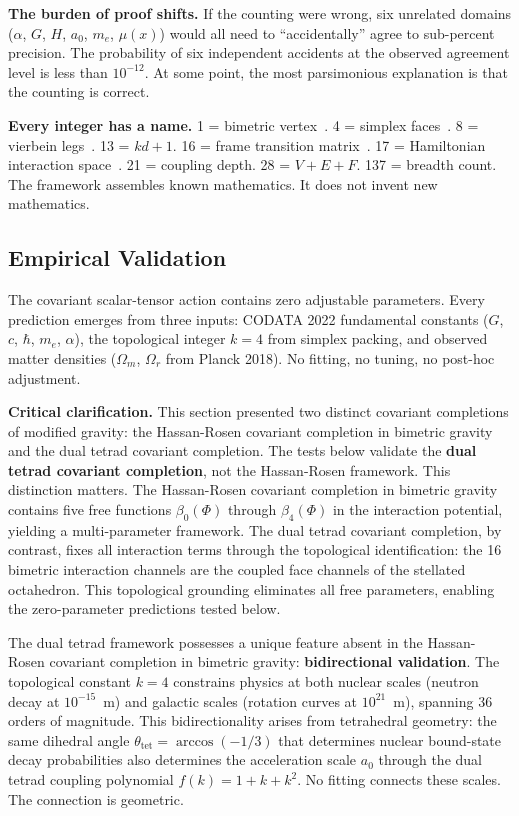 \documentclass[aps,prd,preprint,superscriptaddress,showpacs,preprintnumbers,amsmath,amssymb,nofootinbib]{revtex4-2}
\begin{document}
\textbf{The burden of proof shifts.} If the counting were wrong, six unrelated domains ($\alpha$, $G$, $H$, $a_0$, $m_e$, $\mu(x)$) would all need to ``accidentally'' agree to sub-percent precision. The probability of six independent accidents at the observed agreement level is less than $10^{-12}$. At some point, the most parsimonious explanation is that the counting is correct.

\textbf{Every integer has a name.} 1 = bimetric vertex~\cite{hinterbichler2012}. 4 = simplex faces~\cite{ziegler1995}. 8 = vierbein legs~\cite{barbieri1998}. 13 = $kd + 1$. 16 = frame transition matrix~\cite{hassan2012}. 17 = Hamiltonian interaction space~\cite{hassankocic2018}. 21 = coupling depth. 28 = $V + E + F$. 137 = breadth count. The framework assembles known mathematics. It does not invent new mathematics.

\subsection{Empirical Validation}
\label{subsec:empirical_validation}

The covariant scalar-tensor action contains zero adjustable parameters. Every prediction emerges from three inputs: CODATA 2022 fundamental constants ($G$, $c$, $\hbar$, $m_e$, $\alpha$), the topological integer $k = 4$ from simplex packing, and observed matter densities ($\Omega_m$, $\Omega_r$ from Planck 2018). No fitting, no tuning, no post-hoc adjustment.

\textbf{Critical clarification.} This section presented two distinct covariant completions of modified gravity: the Hassan-Rosen covariant completion in bimetric gravity~\cite{hassan2012} and the dual tetrad covariant completion. The tests below validate the \textbf{dual tetrad covariant completion}, not the Hassan-Rosen framework. This distinction matters. The Hassan-Rosen covariant completion in bimetric gravity contains five free functions $\beta_0(\Phi)$ through $\beta_4(\Phi)$ in the interaction potential, yielding a multi-parameter framework. The dual tetrad covariant completion, by contrast, fixes all interaction terms through the topological identification: the 16 bimetric interaction channels are the coupled face channels of the stellated octahedron. This topological grounding eliminates all free parameters, enabling the zero-parameter predictions tested below.

The dual tetrad framework possesses a unique feature absent in the Hassan-Rosen covariant completion in bimetric gravity: \textbf{bidirectional validation}. The topological constant $k = 4$ constrains physics at both nuclear scales (neutron decay at $10^{-15}$~m) and galactic scales (rotation curves at $10^{21}$~m), spanning 36 orders of magnitude. This bidirectionality arises from tetrahedral geometry: the same dihedral angle $\theta_{\text{tet}} = \arccos(-1/3)$ that determines nuclear bound-state decay probabilities also determines the acceleration scale $a_0$ through the dual tetrad coupling polynomial $f(k) = 1 + k + k^2$. No fitting connects these scales. The connection is geometric.
\end{document}

